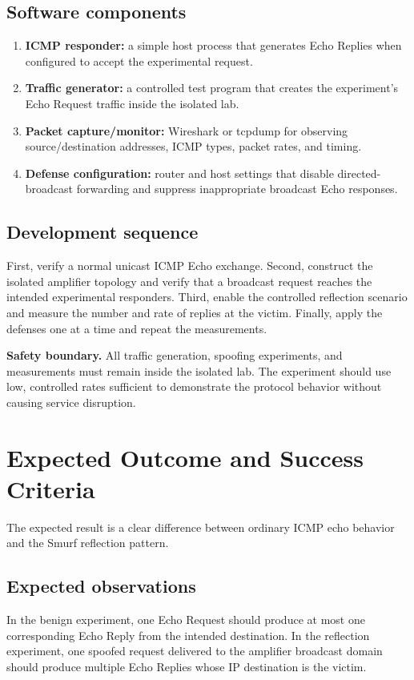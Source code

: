 \documentclass[12pt,a4paper]{article}
\begin{document}
\subsection{Software components}
\begin{enumerate}
\item \textbf{ICMP responder:} a simple host process that generates Echo Replies when configured to accept the experimental request.
\item \textbf{Traffic generator:} a controlled test program that creates the experiment's Echo Request traffic inside the isolated lab.
\item \textbf{Packet capture/monitor:} Wireshark or tcpdump for observing source/destination addresses, ICMP types, packet rates, and timing.
\item \textbf{Defense configuration:} router and host settings that disable directed-broadcast forwarding and suppress inappropriate broadcast Echo responses.
\end{enumerate}

\subsection{Development sequence}
First, verify a normal unicast ICMP Echo exchange. Second, construct the isolated amplifier topology and verify that a broadcast request reaches the intended experimental responders. Third, enable the controlled reflection scenario and measure the number and rate of replies at the victim. Finally, apply the defenses one at a time and repeat the measurements.

\textbf{Safety boundary.} All traffic generation, spoofing experiments, and measurements must remain inside the isolated lab. The experiment should use low, controlled rates sufficient to demonstrate the protocol behavior without causing service disruption.

\section{Expected Outcome and Success Criteria}
The expected result is a clear difference between ordinary ICMP echo behavior and the Smurf reflection pattern.

\subsection{Expected observations}
In the benign experiment, one Echo Request should produce at most one corresponding Echo Reply from the intended destination. In the reflection experiment, one spoofed request delivered to the amplifier broadcast domain should produce multiple Echo Replies whose IP destination is the victim.
\end{document}
